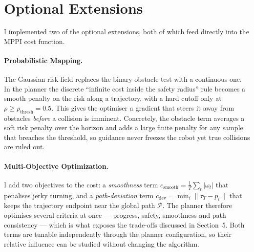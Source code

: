 \section{Optional Extensions}

I implemented two of the optional extensions, both of which feed directly into the MPPI cost
function.

\paragraph{Probabilistic Mapping.} The Gaussian risk field replaces
the binary obstacle test with a continuous one. In the planner the discrete ``infinite cost
inside the safety radius'' rule becomes a smooth penalty on the risk along a trajectory, with
a hard cutoff only at $\rho\ge\rho_\text{thresh}=0.5$. This gives the optimiser a gradient
that steers it away from obstacles \emph{before} a collision is imminent. Concretely, the
obstacle term averages a soft risk penalty over the horizon and adds a large finite penalty
for any sample that breaches the threshold, so guidance never freezes the robot yet true
collisions are ruled out.

\paragraph{Multi-Objective Optimization.} I add two objectives to the cost: a
\emph{smoothness} term $c_\text{smooth}=\frac1T\sum_t|\omega_t|$ that penalises jerky turning,
and a \emph{path-deviation} term $c_\text{dev}=\min_i\|\tau_T-p_i\|$ that keeps the trajectory
endpoint near the global path $\mathcal{P}$. The planner therefore optimises several criteria
at once --- progress, safety, smoothness and path consistency --- which is what exposes the
trade-offs discussed in Section~5. Both terms are tunable independently through the planner
configuration, so their relative influence can be studied without changing the algorithm.
